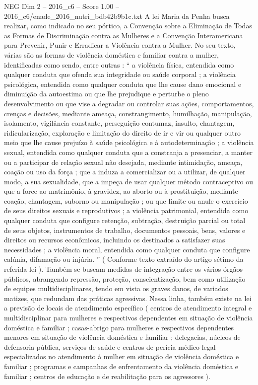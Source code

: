 \begin{textsample}{NEG Dim 2 – 2016\_c6 – Score 1.00 – 2016\_c6/enade\_2016\_nutri\_bdb42b9b1c.txt}
A lei Maria da Penha busca realizar, como indicado no seu pórtico, a Convenção sobre a Eliminação de Todas as Formas de Discriminação contra as Mulheres e a Convenção Interamericana para Prevenir, Punir e Erradicar a Violência contra a Mulher.
No seu texto, várias são as formas de violência doméstica e familiar contra a mulher, identificadas como sendo, entre outras : “ a violência física, entendida como qualquer conduta que ofenda sua integridade ou saúde corporal ; a violência psicológica, entendida como qualquer conduta que lhe cause dano emocional e diminuição da autoestima ou que lhe prejudique e perturbe o pleno desenvolvimento ou que vise a degradar ou controlar suas ações, comportamentos, crenças e decisões, mediante ameaça, constrangimento, humilhação, manipulação, isolamento, vigilância constante, perseguição contumaz, insulto, chantagem, ridicularização, exploração e limitação do direito de ir e vir ou qualquer outro meio que lhe cause prejuízo à saúde psicológica e à autodeterminação ; a violência sexual, entendida como qualquer conduta que a constranja a presenciar, a manter ou a participar de relação sexual não desejada, mediante intimidação, ameaça, coação ou uso da força ; que a induza a comercializar ou a utilizar, de qualquer modo, a sua sexualidade, que a impeça de usar qualquer método contraceptivo ou que a force ao matrimônio, à gravidez, ao aborto ou à prostituição, mediante coação, chantagem, suborno ou manipulação ; ou que limite ou anule o exercício de seus direitos sexuais e reprodutivos ; a violência patrimonial, entendida como qualquer conduta que configure retenção, subtração, destruição parcial ou total de seus objetos, instrumentos de trabalho, documentos pessoais, bens, valores e direitos ou recursos econômicos, incluindo os destinados a satisfazer suas necessidades ; a violência moral, entendida como qualquer conduta que configure calúnia, difamação ou injúria. ” ( Conforme texto extraído do artigo sétimo da referida lei ).
Também se buscam medidas de integração entre os vários órgãos públicos, abrangendo repressão, proteção, conscientização, bem como utilização de equipes multidisciplinares, tendo em vista os graves danos, de variados matizes, que redundam das práticas agressivas.
Nessa linha, também existe na lei a previsão de locais de atendimento específico ( centros de atendimento integral e multidisciplinar para mulheres e respectivos dependentes em situação de violência doméstica e familiar ; casas-abrigo para mulheres e respectivos dependentes menores em situação de violência doméstica e familiar ; delegacias, núcleos de defensoria pública, serviços de saúde e centros de perícia médico-legal especializados no atendimento à mulher em situação de violência doméstica e familiar ; programas e campanhas de enfrentamento da violência doméstica e familiar ; centros de educação e de reabilitação para os agressores ).

\end{textsample}
